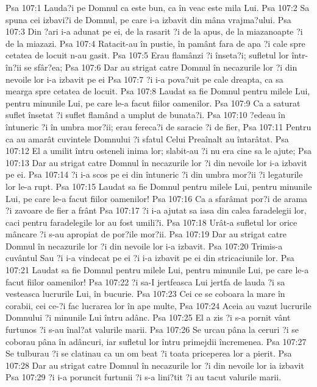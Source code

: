 Psa 107:1  Lauda?i pe Domnul ca este bun, ca în veac este mila Lui.
Psa 107:2  Sa spuna cei izbavi?i de Domnul, pe care i-a izbavit din mâna vrajma?ului.
Psa 107:3  Din ?ari i-a adunat pe ei, de la rasarit ?i de la apus, de la miazanoapte ?i de la miazazi.
Psa 107:4  Ratacit-au în pustie, în pamânt fara de apa ?i cale spre cetatea de locuit n-au gasit.
Psa 107:5  Erau flamânzi ?i înseta?i; sufletul lor într-în?ii se sfâr?ea;
Psa 107:6  Dar au strigat catre Domnul în necazurile lor ?i din nevoile lor i-a izbavit pe ei
Psa 107:7  ?i i-a pova?uit pe cale dreapta, ca sa mearga spre cetatea de locuit.
Psa 107:8  Laudat sa fie Domnul pentru milele Lui, pentru minunile Lui, pe care le-a facut fiilor oamenilor.
Psa 107:9  Ca a saturat suflet însetat ?i suflet flamând a umplut de bunata?i.
Psa 107:10  ?edeau în întuneric ?i în umbra mor?ii; erau fereca?i de saracie ?i de fier,
Psa 107:11  Pentru ca au amarât cuvintele Domnului ?i sfatul Celui Preaînalt au întarâtat.
Psa 107:12  El a umilit întru osteneli inima lor; slabit-au ?i nu era cine sa le ajute;
Psa 107:13  Dar au strigat catre Domnul în necazurile lor ?i din nevoile lor i-a izbavit pe ei.
Psa 107:14  ?i i-a scos pe ei din întuneric ?i din umbra mor?ii ?i legaturile lor le-a rupt.
Psa 107:15  Laudat sa fie Domnul pentru milele Lui, pentru minunile Lui, pe care le-a facut fiilor oamenilor!
Psa 107:16  Ca a sfarâmat por?i de arama ?i zavoare de fier a frânt
Psa 107:17  ?i i-a ajutat sa iasa din calea faradelegii lor, caci pentru faradelegile lor au fost umili?i.
Psa 107:18  Urât-a sufletul lor orice mâncare ?i s-au apropiat de por?ile mor?ii.
Psa 107:19  Dar au strigat catre Domnul în necazurile lor ?i din nevoile lor i-a izbavit.
Psa 107:20  Trimis-a cuvântul Sau ?i i-a vindecat pe ei ?i i-a izbavit pe ei din stricaciunile lor.
Psa 107:21  Laudat sa fie Domnul pentru milele Lui, pentru minunile Lui, pe care le-a facut fiilor oamenilor!
Psa 107:22  ?i sa-I jertfeasca Lui jertfa de lauda ?i sa vesteasca lucrurile Lui, în bucurie.
Psa 107:23  Cei ce se coboara la mare în corabii, cei ce-?i fac lucrarea lor în ape multe,
Psa 107:24  Aceia au vazut lucrurile Domnului ?i minunile Lui întru adânc.
Psa 107:25  El a zis ?i s-a pornit vânt furtunos ?i s-au înal?at valurile marii.
Psa 107:26  Se urcau pâna la ceruri ?i se coborau pâna în adâncuri, iar sufletul lor întru primejdii încremenea.
Psa 107:27  Se tulburau ?i se clatinau ca un om beat ?i toata priceperea lor a pierit.
Psa 107:28  Dar au strigat catre Domnul în necazurile lor ?i din nevoile lor ia izbavit
Psa 107:29  ?i i-a poruncit furtunii ?i s-a lini?tit ?i au tacut valurile marii.
